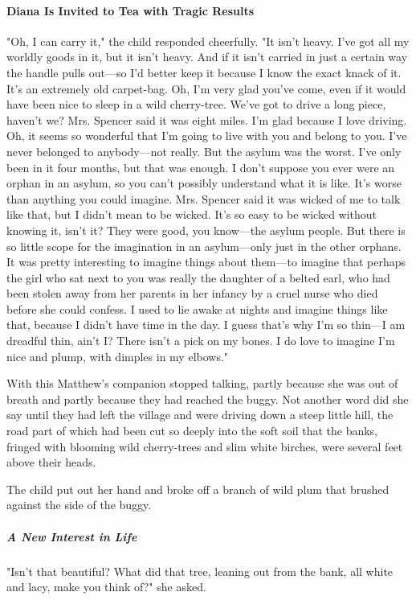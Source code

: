\documentclass{article}
\begin{document}
\paragraph{Diana Is Invited to Tea with Tragic Results}
"Oh, I can carry it," the child responded cheerfully. "It isn't heavy. I've got all my worldly goods in it, but it isn't heavy. And if it isn't carried in just a certain way the handle pulls out---so I'd better keep it because I know the exact knack of it. It's an extremely old carpet-bag. Oh, I'm very glad you've come, even if it would have been nice to sleep in a wild cherry-tree. We've got to drive a long piece, haven't we? Mrs. Spencer said it was eight miles. I'm glad because I love driving. Oh, it seems so wonderful that I'm going to live with you and belong to you. I've never belonged to anybody---not really. But the asylum was the worst. I've only been in it four months, but that was enough. I don't suppose you ever were an orphan in an asylum, so you can't possibly understand what it is like. It's worse than anything you could imagine. Mrs. Spencer said it was wicked of me to talk like that, but I didn't mean to be wicked. It's so easy to be wicked without knowing it, isn't it? They were good, you know---the asylum people. But there is so little scope for the imagination in an asylum---only just in the other orphans. It was pretty interesting to imagine things about them---to imagine that perhaps the girl who sat next to you was really the daughter of a belted earl, who had been stolen away from her parents in her infancy by a cruel nurse who died before she could confess. I used to lie awake at nights and imagine things like that, because I didn't have time in the day. I guess that's why I'm so thin---I am dreadful thin, ain't I? There isn't a pick on my bones. I do love to imagine I'm nice and plump, with dimples in my elbows."

With this Matthew's companion stopped talking, partly because she was out of breath and partly because they had reached the buggy. Not another word did she say until they had left the village and were driving down a steep little hill, the road part of which had been cut so deeply into the soft soil that the banks, fringed with blooming wild cherry-trees and slim white birches, were several feet above their heads.

The child put out her hand and broke off a branch of wild plum that brushed against the side of the buggy.

\subparagraph{A New Interest in Life}
"Isn't that beautiful? What did that tree, leaning out from the bank, all white and lacy, make you think of?" she asked.
\end{document}
